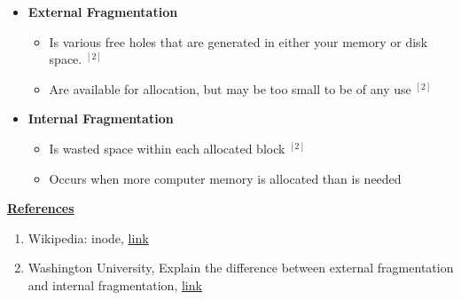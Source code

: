 \documentclass[12pt]{article}
\begin{document}
\begin{enumerate}[1.]
\begin{enumerate}[a)]
\begin{itemize}
            \item \textbf{External Fragmentation}

            \begin{itemize}
                \item Is various free holes that are generated in either your
                memory or disk space. $^{[2]}$
                \item Are available for allocation, but may be too small to be of
                any use $^{[2]}$
            \end{itemize}

            \item \textbf{Internal Fragmentation}

            \begin{itemize}
                \item Is wasted space within each allocated block $^{[2]}$
                \item Occurs when more computer memory is allocated than is needed
            \end{itemize}
        \end{itemize}

        \bigskip

        \underline{\textbf{References}}

        \begin{enumerate}[1)]
            \item Wikipedia: inode, \href{https://en.wikipedia.org/wiki/Inode}{link}
            \item Washington University, Explain the difference between external fragmentation
            and internal fragmentation, \href{https://courses.cs.washington.edu/courses/cse451/00sp/misc/quiz2sol.txt}{link}
        \end{enumerate}
    \end{enumerate}
\end{enumerate}
\end{document}
